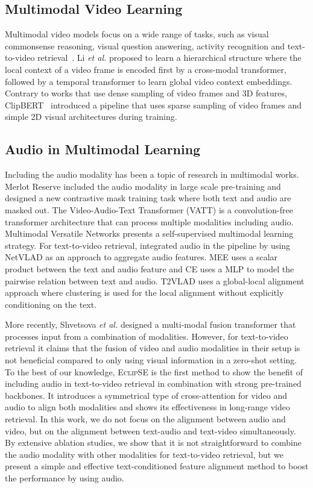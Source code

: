 \documentclass[10pt,twocolumn,letterpaper]{article}
\begin{document}
\subsection{Multimodal Video Learning}
Multimodal video models focus on a wide range of tasks, such as visual commonsense reasoning, visual question answering, activity recognition and text-to-video retrieval~\cite{xu2022multimodal}. Li \textit{et al.} \cite{li2020hero} proposed to learn a hierarchical structure where the local context of a video frame is encoded first by a cross-modal transformer, followed by a temporal transformer to learn global video context embeddings. Contrary to works that use dense sampling of video frames and 3D features, ClipBERT~\cite{lei2021clipbert} introduced a pipeline that uses sparse sampling of video frames and simple 2D visual architectures during training. 

\subsection{Audio in Multimodal Learning}
Including the audio modality has been a topic of research in multimodal works. Merlot Reserve \cite{merlot_reserve} included the audio modality in large scale pre-training and designed a new contrastive mask training task where both text and audio are masked out. The Video-Audio-Text Transformer (VATT) \cite{vatt} is a convolution-free transformer architecture that can process multiple modalities including audio. Multimodal Versatile Networks \cite{MMVN} presents a self-supervised multimodal learning strategy. For text-to-video retrieval, \cite{miech18learning, collab_experts, wang2021t2vlad} integrated audio in the pipeline by using NetVLAD as an approach to aggregate audio features. MEE \cite{miech18learning} uses a scalar product between the text and audio feature and CE \cite{collab_experts} uses a MLP to model the pairwise relation between text and audio. T2VLAD \cite{wang2021t2vlad} uses a global-local alignment approach where clustering is used for the local alignment without explicitly conditioning on the text. 

More recently, Shvetsova \textit{et al.} \cite{everythingatonce} designed a multi-modal fusion transformer that processes input from a combination of modalities. However, for text-to-video retrieval it claims that the fusion of video and audio modalities in their setup is not beneficial compared to only using visual information in a zero-shot setting. 
To the best of our knowledge, E\textsc{clip}SE \cite{ECLIPSE_ECCV22} is the first method to show the benefit of including audio in text-to-video retrieval in combination with strong pre-trained backbones. It introduces a symmetrical type of cross-attention for video and audio to align both modalities and shows its effectiveness in long-range video retrieval. In this work, we do not focus on the alignment between audio and video, but on the alignment between text-audio and text-video simultaneously. By extensive ablation studies, we show that it is not straightforward to combine the audio modality with other modalities for text-to-video retrieval, but we present a simple and effective text-conditioned feature alignment method to boost the performance by using audio. 
 
\end{document}
